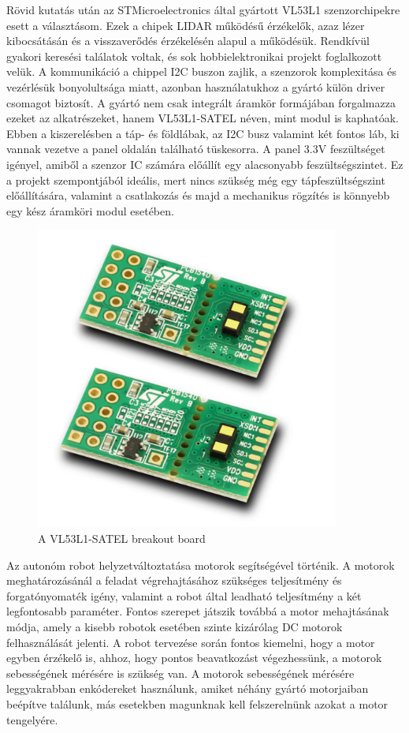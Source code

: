 Rövid kutatás után az STMicroelectronics által gyártott VL53L1 szenzorchipekre
esett a választásom. Ezek a chipek LIDAR működésű érzékelők, azaz lézer
kibocsátásán és a visszaverődés érzékelésén alapul a működésük. Rendkívül gyakori
keresési találatok voltak, és sok hobbielektronikai projekt foglalkozott velük. A
kommunikáció a chippel I2C buszon zajlik, a szenzorok komplexitása és vezérlésük
bonyolultsága miatt, azonban használatukhoz a gyártó külön driver csomagot
biztosít. A gyártó nem csak integrált áramkör formájában forgalmazza ezeket az
alkatrészeket, hanem VL53L1-SATEL néven, mint modul is kaphatóak. Ebben a
kiszerelésben a táp- és földlábak, az I2C busz valamint két fontos láb, ki vannak
vezetve a panel oldalán található tüskesorra.  A panel 3.3V feszültséget igényel,
amiből a szenzor IC számára előállít egy alacsonyabb feszültségszintet. Ez a
projekt szempontjából ideális, mert nincs szükség még egy tápfeszültségszint
előállítására, valamint a csatlakozás és majd a mechanikus rögzítés is könnyebb
egy kész áramköri modul esetében.

\begin{figure}
  \centering
  \includegraphics[width=100mm, keepaspectratio]{figures/ch1/vl53.png}
  \caption{A VL53L1-SATEL breakout board\cite{vl53l1source}}
  \label{fig:sensor}
\end{figure}

Az autonóm robot helyzetváltoztatása motorok segítségével történik. A motorok
meghatározásánál a feladat végrehajtásához szükséges teljesítmény és
forgatónyomaték igény, valamint a robot által leadható teljesítmény a két
legfontosabb paraméter. Fontos szerepet játszik továbbá a motor mehajtásának
módja, amely a kisebb robotok esetében szinte kizárólag DC motorok felhasználását
jelenti. A robot tervezése során fontos kiemelni, hogy a motor egyben érzékelő
is, ahhoz, hogy pontos beavatkozást végezhessünk, a motorok sebességének mérésére
is szükség van. A motorok sebességének mérésére leggyakrabban enkódereket
használunk, amiket néhány gyártó motorjaiban beépítve találunk, más esetekben
magunknak kell felszerelnünk azokat a motor tengelyére.

